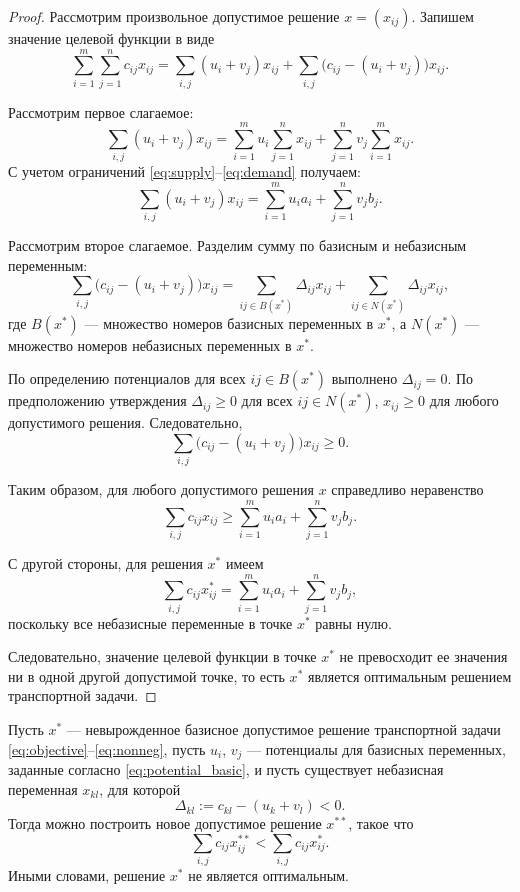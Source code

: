 \documentclass[12pt]{article}
\theoremstyle{definition}
\theoremstyle{plain}
\theoremstyle{definition}
\begin{document}
\begin{proof}
Рассмотрим произвольное допустимое решение $x = (x_{ij})$.
Запишем значение целевой функции в виде
\[
\sum_{i=1}^m \sum_{j=1}^n c_{ij} x_{ij}
=
\sum_{i,j} (u_i + v_j) x_{ij}
+
\sum_{i,j} \bigl(c_{ij} - (u_i + v_j)\bigr) x_{ij}.
\]

Рассмотрим первое слагаемое:
\[
\sum_{i,j} (u_i + v_j) x_{ij}
=
\sum_{i=1}^m u_i \sum_{j=1}^n x_{ij}
+
\sum_{j=1}^n v_j \sum_{i=1}^m x_{ij}.
\]
С учетом ограничений \eqref{eq:supply}–\eqref{eq:demand} получаем:
\[
\sum_{i,j} (u_i + v_j) x_{ij}
=
\sum_{i=1}^m u_i a_i + \sum_{j=1}^n v_j b_j.
\]

Рассмотрим второе слагаемое. Разделим сумму по базисным и небазисным переменным:
\[
\sum_{i,j} \bigl(c_{ij} - (u_i + v_j)\bigr) x_{ij}
=
\sum_{ij\in B(x^*)} \Delta_{ij} x_{ij}
+
\sum_{ij\in N(x^*)} \Delta_{ij} x_{ij},
\]
где $B(x^*)$ — множество номеров базисных переменных в $x^*$,
а $N(x^*)$ — множество номеров небазисных переменных в $x^*$.

По определению потенциалов для всех $ij\in B(x^*)$ выполнено $\Delta_{ij}=0$.
По предположению утверждения $\Delta_{ij}\ge 0$ для всех $ij\in N(x^*)$,
$x_{ij}\ge 0$ для любого допустимого решения.
Следовательно,
\[
\sum_{i,j} \bigl(c_{ij} - (u_i + v_j)\bigr) x_{ij} \ge 0.
\]

Таким образом, для любого допустимого решения $x$ справедливо неравенство
\[
\sum_{i,j} c_{ij} x_{ij}
\ge
\sum_{i=1}^m u_i a_i + \sum_{j=1}^n v_j b_j.
\]

С другой стороны, для решения $x^*$ имеем
\[
\sum_{i,j} c_{ij} x^*_{ij}
=
\sum_{i=1}^m u_i a_i + \sum_{j=1}^n v_j b_j,
\]
поскольку все небазисные переменные в точке $x^*$ равны нулю.

Следовательно, значение целевой функции в точке $x^*$
не превосходит ее значения ни в одной другой допустимой точке,
то есть $x^*$ является оптимальным решением транспортной задачи.
\end{proof}


\begin{assertionlocal}\label{assert:optimal}
Пусть $x^*$ --- невырожденное базисное допустимое решение транспортной задачи
\eqref{eq:objective}--\eqref{eq:nonneg},
пусть $u_i$, $v_j$ --- потенциалы для базисных переменных, заданные согласно
\ref{eq:potential_basic}, и пусть существует
небазисная переменная $x_{kl}$, для которой
\[
\Delta_{kl} := c_{kl} - (u_k + v_l) < 0.
\]
Тогда можно построить новое допустимое решение $x^{**}$, такое что
\[
\sum_{i,j} c_{ij} x^{**}_{ij} < \sum_{i,j} c_{ij} x^*_{ij}.
\]
Иными словами, решение $x^*$ не является оптимальным.
\end{assertionlocal}
\end{document}
